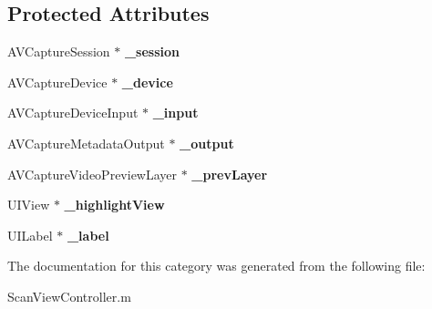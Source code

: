\subsection*{Protected Attributes}
\begin{DoxyCompactItemize}
\item 
A\+V\+Capture\+Session $\ast$ {\bfseries \+\_\+session}\label{category_scan_view_controller_07_08_aaa4b54d43d608a14daff099ca2b5e890}

\item 
A\+V\+Capture\+Device $\ast$ {\bfseries \+\_\+device}\label{category_scan_view_controller_07_08_a8b405bf0c7038a049b8f06da863181f3}

\item 
A\+V\+Capture\+Device\+Input $\ast$ {\bfseries \+\_\+input}\label{category_scan_view_controller_07_08_a13d525b2d8534c27560147b3415080ea}

\item 
A\+V\+Capture\+Metadata\+Output $\ast$ {\bfseries \+\_\+output}\label{category_scan_view_controller_07_08_a458e5f4f769b551dda293364db849e40}

\item 
A\+V\+Capture\+Video\+Preview\+Layer $\ast$ {\bfseries \+\_\+prev\+Layer}\label{category_scan_view_controller_07_08_aae6661ab8758207b3b8a9b39ed9a5edd}

\item 
U\+I\+View $\ast$ {\bfseries \+\_\+highlight\+View}\label{category_scan_view_controller_07_08_a75a7b0ae5ed591056f8a3d351fb35d10}

\item 
U\+I\+Label $\ast$ {\bfseries \+\_\+label}\label{category_scan_view_controller_07_08_a9c46ee545352636c2e8b649a106f7eda}

\end{DoxyCompactItemize}


The documentation for this category was generated from the following file\+:\begin{DoxyCompactItemize}
\item 
Scan\+View\+Controller.\+m\end{DoxyCompactItemize}
